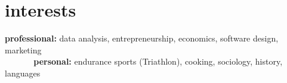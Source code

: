 \documentclass[]{friggeri-cv} %
\begin{document}
\section{interests}

\textbf{professional:} data analysis, entrepreneurship, economics, software design, marketing \\
\textbf{\ \ \ \ \ \ personal:} endurance sports (Triathlon), cooking, sociology, history, languages









\end{document}
